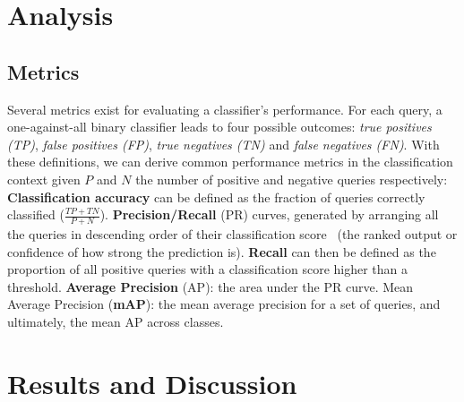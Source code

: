 

\section{Analysis} \label{sec:analysis}

\subsection{Metrics}
Several metrics exist for evaluating a classifier's performance. For each query, a one-against-all binary classifier leads to four possible outcomes: \emph{true positives (TP)}, \emph{false positives (FP)}, \emph{true negatives (TN)} and \emph{false negatives (FN)}. With these definitions, we can derive common performance metrics in the classification context given $P$ and $N$ the number of positive and negative queries respectively: \textbf{Classification accuracy} can be defined as the fraction of queries correctly classified ($\frac{TP+TN}{P+N}$). \textbf{Precision/Recall} (PR) curves, generated by arranging all the queries in descending order of their classification score~\cite{Everingham2009} (\ie the ranked output or confidence of how strong the prediction is). \textbf{Recall} can then be defined as the proportion of all positive queries with a classification score higher than a threshold. \textbf{Average Precision} (AP): the area under the PR curve. Mean Average Precision (\textbf{mAP}): the mean average precision for a set of queries, and ultimately, the mean AP across classes.


\section{Results and Discussion} \label{sec:analysis} \label{sec:results}


